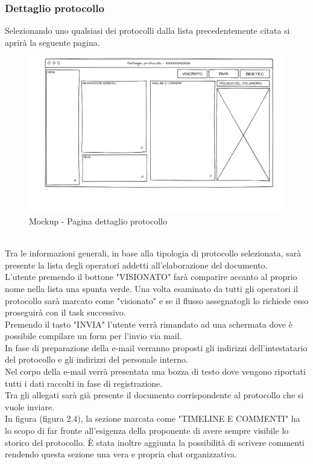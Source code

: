 \subsubsection{Dettaglio protocollo}
Selezionando uno qualsiasi dei protocolli dalla lista precedentemente citata si aprirà la seguente pagina.
\begin{figure}[!h] 
    \centering 
    \includegraphics[width=1\columnwidth]{immagini/mockup/Editpage.png}
    \caption{Mockup - Pagina dettaglio protocollo}
\end{figure}
\\
Tra le informazioni generali, in base alla tipologia di protocollo selezionata, sarà presente la lista degli operatori addetti all'elaborazione del documento.
\\
L'utente premendo il bottone "VISIONATO" farà comparire accanto al proprio nome nella lista una spunta verde. Una volta esaminato da tutti gli operatori il protocollo sarà marcato come "visionato" e se il flusso assegnatogli lo richiede esso proseguirà con il task successivo.
\\
Premendo il tasto "INVIA" l'utente verrà rimandato ad una schermata dove è possibile compilare un form per l'invio via mail. 
\\
In fase di preparazione della e-mail verranno proposti gli indirizzi dell'intestatario del protocollo e gli indirizzi del personale interno.
\\
Nel corpo della e-mail verrà presentata una bozza di testo dove vengono riportati tutti i dati raccolti in fase di registrazione.
\\
Tra gli allegati sarà già presente il documento corrispondente al protocollo che si vuole inviare.
\\
In figura (figura 2.4), la sezione marcata come "TIMELINE E COMMENTI" ha lo scopo di far fronte all'esigenza della proponente di avere sempre visibile lo storico del protocollo. È stata inoltre aggiunta la possibilità di scrivere commenti rendendo questa sezione una vera e propria chat organizzativa.

